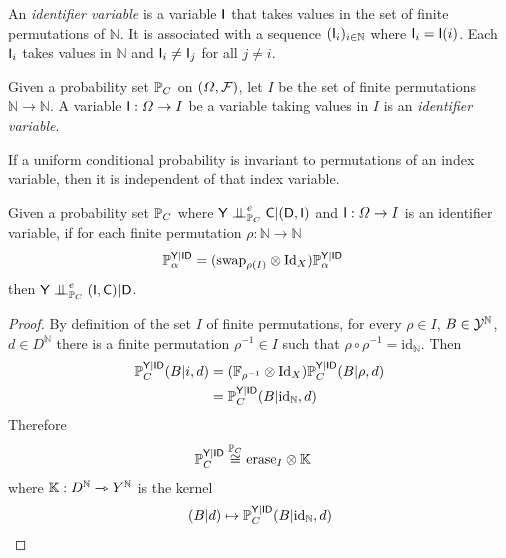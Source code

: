An \emph{identifier variable} is a variable $\mathsf{I}$ that takes values in the set of finite permutations of $\mathbb{N}$. It is associated with a sequence $(\mathsf{I}_i)_{i\in \mathbb{N}}$ where $\mathsf{I}_i=\mathsf{I}(i)$. Each $\mathsf{I}_i$ takes values in $\mathbb{N}$ and $\mathsf{I}_i\neq \mathsf{I}_j$ for all $j\neq i$.

\begin{definition}
Given a probability set $\mathbb{P}_C$ on $(\Omega,\mathcal{F})$, let $I$ be the set of finite permutations $\mathbb{N}\to \mathbb{N}$. A variable $\mathsf{I}:\Omega\to I$ be a variable taking values in $I$ is an \emph{identifier variable}.
\end{definition}

If a uniform conditional probability is invariant to permutations of an index variable, then it is independent of that index variable.

\begin{lemma}\label{lem:ind}
Given a probability set $\mathbb{P}_C$ where $\RV{Y}\CI_{\prob{P}_C}^e \RV{C}|(\RV{D},\RV{I})$ and $\mathsf{I}:\Omega\to I$ is an identifier variable, if for each finite permutation $\rho:\mathbb{N}\to \mathbb{N}$
\begin{align}
    \mathbb{P}_\alpha^{\mathsf{Y}|\mathsf{ID}} &= (\text{swap}_{\rho(I)}\otimes \text{Id}_X )\mathbb{P}_\alpha^{\mathsf{Y}|\mathsf{ID}}
\end{align}
then $\RV{Y}\CI_{\prob{P}_C}^e (\RV{I},\RV{C})|\RV{D}$.
\end{lemma}

\begin{proof}
By definition of the set $I$ of finite permutations, for every $\rho\in I$, $B\in\mathcal{Y}^{\mathbb{N}}$, $d\in D^{\mathbb{N}}$ there is a finite permutation $\rho^{-1}\in I$ such that $\rho\circ\rho^{-1}=\text{id}_{\mathbb{N}}$. Then
\begin{align}
    \mathbb{P}_C^{\mathsf{Y}|\mathsf{ID}}(B|i,d) &= (\mathbb{F}_{\rho^{-1}}\otimes \text{Id}_X )\mathbb{P}_C^{\mathsf{Y}|\mathsf{ID}}(B|\rho,d)\\
    &= \mathbb{P}_C^{\mathsf{Y}|\mathsf{ID}}(B|\text{id}_{\mathbb{N}},d)
\end{align}
Therefore
\begin{align}
    \mathbb{P}_C^{\mathsf{Y}|\mathsf{ID}} &\overset{\mathbb{P}_C}{\cong} \text{erase}_{I}\otimes \mathbb{K} 
\end{align}
where $\mathbb{K}:D^{\mathbb{N}}\rightarrowtriangle Y^{\mathbb{N}}$ is the kernel
\begin{align}
    (B|d)\mapsto \mathbb{P}_C^{\mathsf{Y}|\mathsf{ID}}(B|\text{id}_{\mathbb{N}},d)
\end{align}
\end{proof}

